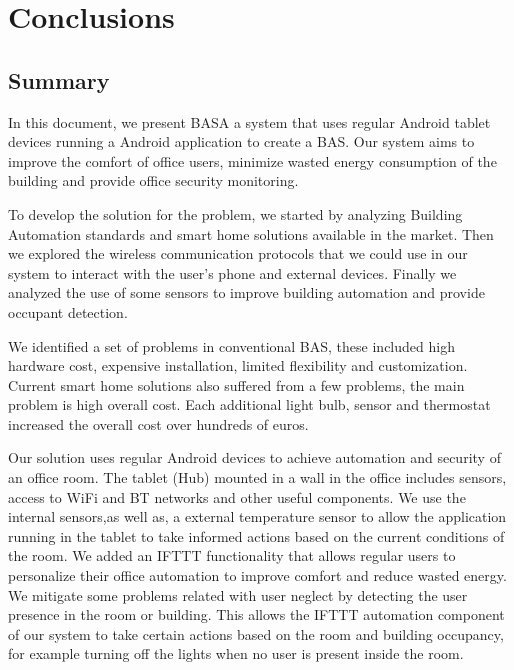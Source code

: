 \chapter{Conclusions}
\label{chapter:conclusion}

\section{Summary}
\label{section:summary}


In this document, we present BASA a system that uses regular Android tablet devices running a Android application to create a \ac{BAS}. Our system aims to improve the comfort of office users, minimize wasted energy consumption of the building and provide office security monitoring. 

To develop the solution for the problem, we started by analyzing Building Automation standards and smart home solutions available in the market. Then we explored the wireless communication protocols that we could use in our system to interact with the user's phone and external devices. Finally we analyzed the use of some sensors to improve building automation and provide occupant detection. 

We identified a set of problems in conventional \ac{BAS}, these included high hardware cost, expensive installation, limited flexibility and customization.
Current smart home solutions also suffered from a few problems, the main problem is high overall cost. Each additional light bulb, sensor and thermostat increased the overall cost over hundreds of euros.

Our solution uses regular Android devices to achieve automation and security of an office room. The tablet (Hub) mounted in a wall in the office includes sensors, access to \ac{WiFi} and \ac{BT} networks and other useful components. We use the internal sensors,as well as, a external temperature sensor to allow the application running in the tablet to take informed actions based on the current conditions of the room. 
We added an \ac{IFTTT} functionality that allows regular users to personalize their office automation to improve comfort and reduce wasted energy. We mitigate some problems related with user neglect by detecting the user presence in the room or building. This allows the \ac{IFTTT} automation component of our system to take certain actions based on the room and building occupancy, for example turning off the lights when no user is present inside the room.



